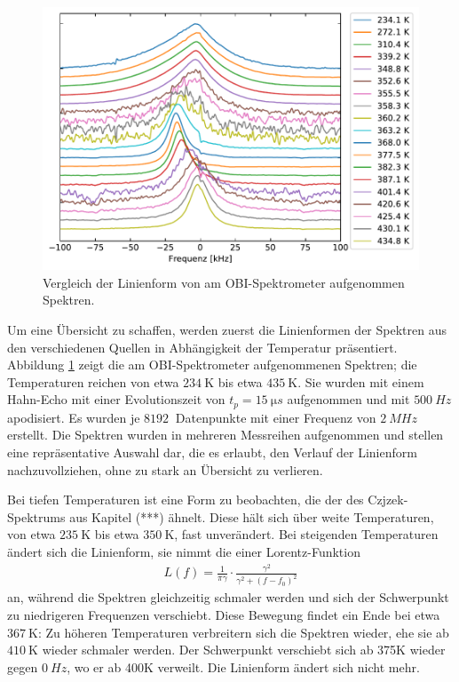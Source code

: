 \begin{figure}
	\begin{center}
		\includegraphics[width=\textwidth]{graphics/plot/spek_lineshape.pdf}
	\end{center}
	\caption{Vergleich der Linienform von am OBI-Spektrometer aufgenommen Spektren.} \label{fig:res:spek_linienform}
\end{figure}
Um eine Übersicht zu schaffen, werden zuerst die Linienformen der Spektren aus den verschiedenen Quellen in Abhängigkeit der Temperatur präsentiert. Abbildung \ref{fig:res:spek_linienform} zeigt die am OBI-Spektrometer aufgenommenen Spektren; die Temperaturen reichen von etwa $\SI{234}{\kelvin}$ bis etwa $\SI{435}{\kelvin}$. Sie wurden mit einem Hahn-Echo mit einer Evolutionszeit von $t_p = \SI{15}{\micro s}$ aufgenommen und mit $\SI{500}{Hz}$ apodisiert. Es wurden je $\SI{8192}{}$ Datenpunkte mit einer Frequenz von $\SI{2}{MHz}$ erstellt. Die Spektren wurden in mehreren Messreihen aufgenommen und stellen eine repräsentative Auswahl dar, die es erlaubt, den Verlauf der Linienform nachzuvollziehen, ohne zu stark an Übersicht zu verlieren.

Bei tiefen Temperaturen ist eine Form zu beobachten, die der des Czjzek-Spektrums aus Kapitel (***) ähnelt. Diese hält sich über weite Temperaturen, von etwa $\SI{235}{\kelvin}$ bis etwa $\SI{350}{\kelvin}$, fast unverändert. Bei steigenden Temperaturen ändert sich die Linienform, sie nimmt die einer Lorentz-Funktion
\begin{align}
	L(f) = \frac{1}{\pi \gamma} \cdot \frac{\gamma^2}{\gamma^2 + (f - f_0)^2} \label{eqn:res:lorentz}
\end{align}
an, während die Spektren gleichzeitig schmaler werden und sich der Schwerpunkt zu niedrigeren Frequenzen verschiebt. Diese Bewegung findet ein Ende bei etwa $\SI{367}{\kelvin}$: Zu höheren Temperaturen verbreitern sich die Spektren wieder, ehe sie ab $\SI{410}{\kelvin}$ wieder schmaler werden. Der Schwerpunkt verschiebt sich ab 375K wieder gegen $\SI{0}{Hz}$, wo er ab 400K verweilt. Die Linienform ändert sich nicht mehr.

